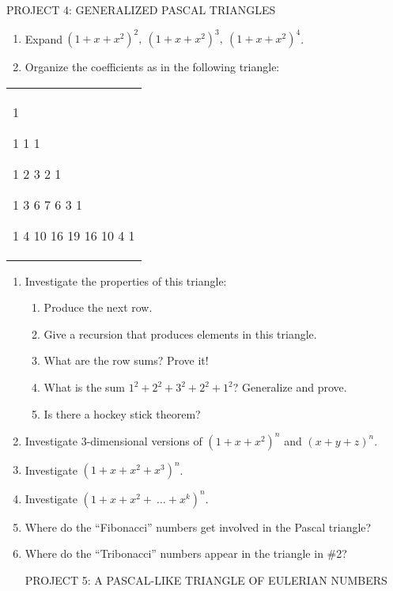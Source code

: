 \documentclass[10pt,letter]{article}
\renewenvironment{quote}
  {\begin{tabular}{|p{13cm}}}
  {\end{tabular}}
\begin{document}
PROJECT 4: GENERALIZED PASCAL TRIANGLES
\begin{enumerate}
\def\labelenumi{\arabic{enumi}.}

\item
  Expand\({\ \left( 1 + x + x^{2} \right)}^{2},\ \left( 1 + x + x^{2} \right)^{3},\ \left( 1 + x + x^{2} \right)^{4}\).
\item
  Organize the coefficients as in the following triangle:

\end{enumerate}
\begin{quote}
1

1 1 1

1 2 3 2 1

1 3 6 7 6 3 1

1 4 10 16 19 16 10 4 1

\end{quote}
\begin{enumerate}
\def\labelenumi{\arabic{enumi}.}

\item
  Investigate the properties of this triangle:
\begin{enumerate}
  \def\labelenumii{\alph{enumii}.}

  \item
    Produce the next row.
  \item
    Give a recursion that produces elements in this triangle.
  \item
    What are the row sums? Prove it!
  \item
    What is the sum \(1^{2} + 2^{2} + 3^{2} + 2^{2} + 1^{2}\)?
    Generalize and prove.
  \item
    Is there a hockey stick theorem?

\end{enumerate}
\item
  Investigate 3-dimensional versions of
  \(\left( 1 + x + x^{2} \right)^{n}\) and
  \(\left( x + y + z \right)^{n}.\)
\item
  Investigate \(\left( 1 + x + x^{2} + x^{3} \right)^{n}\).
\item
  Investigate \(\left( 1 + x + x^{2} + \ \ldots + x^{k} \right)^{n}\).
\item
  Where do the ``Fibonacci'' numbers get involved in the Pascal
  triangle?
\item
  Where do the ``Tribonacci'' numbers appear in the triangle in \#2?

PROJECT 5: A PASCAL-LIKE TRIANGLE OF EULERIAN NUMBERS

\end{enumerate}
\end{document}
